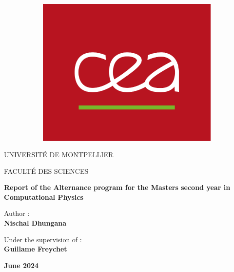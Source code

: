 \begin{figure}[ht]
\begin{subfigure}[b]{0.2\textwidth}
        \includegraphics[width=\textwidth]{images/Logo_cea.png}
    \end{subfigure}
\end{figure}


\begin{center}
\vspace{1.2cm}
\LARGE{UNIVERSITÉ DE MONTPELLIER}
	
\vspace{0.8cm}
\LARGE{FACULTÉ DES SCIENCES}
	
\vspace{1.7cm}	
\Large
\textbf{Report of the Alternance program for the Masters second year in Computational Physics}

\vspace{1.3cm}
\normalsize	{Author :}\\
\vspace{.3cm}
\large{\textbf{Nischal Dhungana}}
	
\vspace{1.3cm}
\normalsize	{Under the supervision of :} \\
\vspace{.3cm}
\large
\textbf{Guillame Freychet}

\vspace{1.3cm}
\textbf{June 2024}
\end{center}